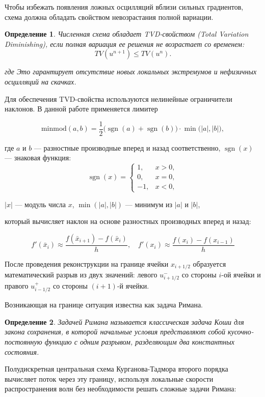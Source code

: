 \documentclass[12pt, a4paper]{article}
\theoremstyle{gostdef}
\newtheorem{defenv}{Определение}[section]
\begin{document}
	Чтобы избежать появления ложных осцилляций вблизи сильных градиентов, схема должна обладать свойством невозрастания полной вариации.
	
	\begin{defenv}
		Численная схема обладает TVD-свойством (Total Variation Diminishing), если полная вариация ее решения не возрастает со временем: 
		\[
			TV(u^{n+1}) \leq TV(u^{n}).
		\]
		
		где 
		Это гарантирует отсутствие новых локальных экстремумов и нефизичных осцилляций на скачках.
	\end{defenv}
	
	Для обеспечения TVD-свойства используются нелинейные ограничители наклонов. В данной работе применяется лимитер
	
	\[
		\text{minmod}(a,b) = \frac{1}{2} \big( \operatorname{sgn}(a) + \operatorname{sgn}(b) \big) \cdot \min\big( |a|, |b| \big),
	\]
	
	где $a$ и $b$ --- разностные производные вперед и назад соответственно, \( \operatorname{sgn}(x) \) — знаковая функция:
	\[
	\operatorname{sgn}(x) =
	\begin{cases} 
		1, & x > 0, \\
		0, & x = 0, \\
		-1, & x < 0,
	\end{cases}
	\]
	
	\( |x| \) — модуль числа \( x \), \( \min(|a|, |b|) \) — минимум из \( |a| \) и \( |b| \),
	
	который вычисляет наклон на основе разностных производных вперед и назад: 
	
	\[
	f'(\bar x_i) \approx \frac{f(\bar x_{i+1}) - f(\bar x_i)}{h} ,\quad	f'(x_i) \approx \frac{f(x_i) - f(x_{i-1})}{h} 
	\]
	
	После проведения реконструкции на границе ячейки $x_{i + 1/2}$ образуется математический разрыв из двух значений: левого $u^{-}_{i + 1/2}$ со стороны $i$-ой ячейки и правого $u^{+}_{i - 1/2}$ со стороны $(i + 1)$-й ячейки. 
	
	Возникающая на границе ситуация известна как задача Римана.
	
	\begin{defenv}
		Задачей Римана называется классическая задача Коши для закона сохранения, в которой начальные условия представляют собой кусочно-постоянную функцию с одним разрывом, разделяющим два константных состояния.
	\end{defenv}
	
	Полудискретная центральная схема Курганова-Тадмора второго порядка вычисляет поток через эту границу, используя локальные скорости распространения волн без необходимости решать сложные задачи Римана:
		
\end{document}

